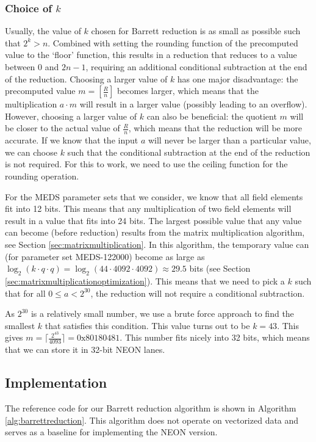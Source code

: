 \documentclass[11pt,a4paper]{report}
\theoremstyle{definition}
\begin{document}
\subsubsection{Choice of $k$}
Usually, the value of $k$ chosen for Barrett reduction is as small as possible such that $2^k > n$. Combined with setting the rounding function of the precomputed value to the `floor' function, this results in a reduction that reduces to a value between $0$ and $2n-1$, requiring an additional conditional subtraction at the end of the reduction. Choosing a larger value of $k$ has one major disadvantage: the precomputed value $m = \left[\frac{R}{n}\right]$ becomes larger, which means that the multiplication $a \cdot m$ will result in a larger value (possibly leading to an overflow). However, choosing a larger value of $k$ can also be beneficial: the quotient $m$ will be closer to the actual value of $\frac{R}{n}$, which means that the reduction will be more accurate. If we know that the input $a$ will never be larger than a particular value, we can choose $k$ such that the conditional subtraction at the end of the reduction is not required. For this to work, we need to use the ceiling function for the rounding operation.

For the MEDS parameter sets that we consider, we know that all field elements fit into 12 bits. This means that any multiplication of two field elements will result in a value that fits into 24 bits. The largest possible value that any value can become (before reduction) results from the matrix multiplication algorithm, see Section \ref{sec:matrixmultiplication}. In this algorithm, the temporary value can (for parameter set MEDS-122000) become as large as $\log_2(k \cdot q \cdot q) = \log_2(44 \cdot 4092 \cdot 4092) \approx 29.5$ bits (see Section \ref{sec:matrixmultiplicationoptimization}). This means that we need to pick a $k$ such that for all $0 \leq a < 2^{30}$, the reduction will not require a conditional subtraction.

As $2^{30}$ is a relatively small number, we use a brute force approach to find the smallest $k$ that satisfies this condition. This value turns out to be $k = 43$. This gives $m = \lceil \frac{2^{43}}{4093} \rceil = 0\text{x}80180481$. This number fits nicely into 32 bits, which means that we can store it in 32-bit NEON lanes.

\subsection{Implementation}
The reference code for our Barrett reduction algorithm is shown in Algorithm \ref{alg:barrettreduction}. This algorithm does not operate on vectorized data and serves as a baseline for implementing the NEON version.
\end{document}
